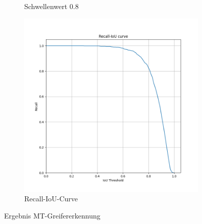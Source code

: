 \begin{figure}[h]
\begin{subfigure}[c]{0.32\textwidth}
			\caption{Schwellenwert 0.8}
			\label{img:BoxPlot_08_MT-Ansatz}	
		\end{subfigure}
		\begin{subfigure}[c]{0.32\textwidth}			
			\includegraphics[width=1\textwidth, center]{bilder/Hauptteil/MT_Grapple/Recall_IoU.png}
			\caption{Recall-IoU-Curve}
			\label{img:RecalllIoUt_MT}	
		\end{subfigure}
		\caption{Ergebnis MT-Greifererkennung}
		\label{img:ErgebnisRegressionMT}
	\end{figure}

